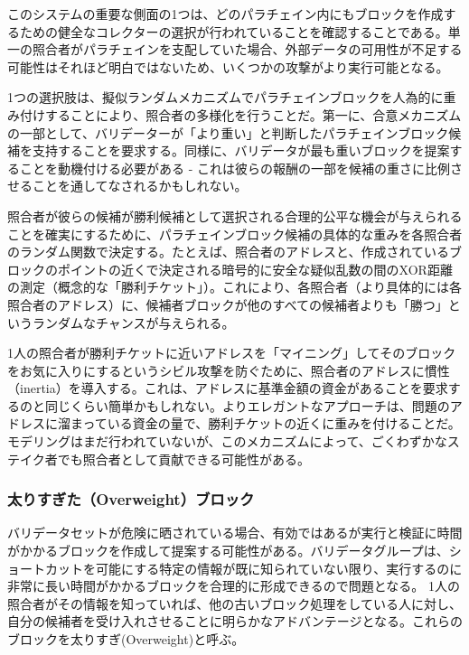 このシステムの重要な側面の1つは、どのパラチェイン内にもブロックを作成するための健全なコレクターの選択が行われていることを確認することである。単一の照合者がパラチェインを支配していた場合、外部データの可用性が不足する可能性はそれほど明白ではないため、いくつかの攻撃がより実行可能となる。

1つの選択肢は、擬似ランダムメカニズムでパラチェインブロックを人為的に重み付けすることにより、照合者の多様化を行うことだ。第一に、合意メカニズムの一部として、バリデーターが「より重い」と判断したパラチェインブロック候補を支持することを要求する。同様に、バリデータが最も重いブロックを提案することを動機付ける必要がある
-
これは彼らの報酬の一部を候補の重さに比例させることを通してなされるかもしれない。

照合者が彼らの候補が勝利候補として選択される合理的公平な機会が与えられることを確実にするために、パラチェインブロック候補の具体的な重みを各照合者のランダム関数で決定する。たとえば、照合者のアドレスと、作成されているブロックのポイントの近くで決定される暗号的に安全な疑似乱数の間のXOR距離の測定（概念的な「勝利チケット」）。これにより、各照合者（より具体的には各照合者のアドレス）に、候補者ブロックが他のすべての候補者よりも「勝つ」というランダムなチャンスが与えられる。

1人の照合者が勝利チケットに近いアドレスを「マイニング」してそのブロックをお気に入りにするというシビル攻撃を防ぐために、照合者のアドレスに慣性（inertia）を導入する。これは、アドレスに基準金額の資金があることを要求するのと同じくらい簡単かもしれない。よりエレガントなアプローチは、問題のアドレスに溜まっている資金の量で、勝利チケットの近くに重みを付けることだ。モデリングはまだ行われていないが、このメカニズムによって、ごくわずかなステイク者でも照合者として貢献できる可能性がある。

\hypertarget{ux592aux308aux3059ux304eux305foverweightux30d6ux30edux30c3ux30af}{%
\subsubsection{太りすぎた（Overweight）ブロック}\label{ux592aux308aux3059ux304eux305foverweightux30d6ux30edux30c3ux30af}}

バリデータセットが危険に晒されている場合、有効ではあるが実行と検証に時間がかかるブロックを作成して提案する可能性がある。バリデータグループは、ショートカットを可能にする特定の情報が既に知られていない限り、実行するのに非常に長い時間がかかるブロックを合理的に形成できるので問題となる。
1人の照合者がその情報を知っていれば、他の古いブロック処理をしている人に対し、自分の候補者を受け入れさせることに明らかなアドバンテージとなる。これらのブロックを太りすぎ(Overweight)と呼ぶ。

